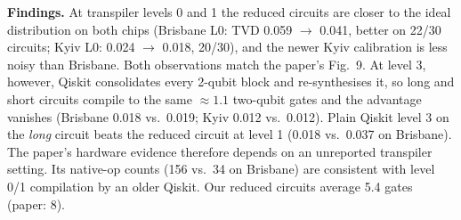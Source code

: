 \textbf{Findings.} At transpiler levels 0 and 1 the reduced circuits are closer to the ideal distribution on both chips
(Brisbane L0: TVD 0.059 $\to$ 0.041, better on 22/30 circuits; Kyiv L0: 0.024 $\to$ 0.018, 20/30), and the newer Kyiv calibration
is less noisy than Brisbane. Both observations match the paper's Fig.~9. At level 3, however, Qiskit consolidates every 2-qubit
block and re-synthesises it, so long and short circuits compile to the same $\approx1.1$ two-qubit gates and the advantage
vanishes (Brisbane 0.018 vs.\ 0.019; Kyiv 0.012 vs.\ 0.012). Plain Qiskit level 3 on the \emph{long} circuit beats the reduced circuit at
level 1 (0.018 vs.\ 0.037 on Brisbane). The paper's hardware evidence therefore depends on an unreported transpiler setting.
Its native-op counts (156 vs.\ 34 on Brisbane) are consistent with level 0/1 compilation by an older Qiskit. Our reduced
circuits average 5.4 gates (paper: 8).
